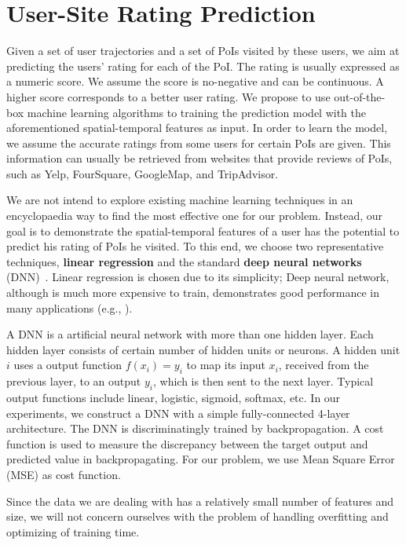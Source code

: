 \section{User-Site Rating Prediction}
\label{sec:prediction}

Given a set of user trajectories and a set of PoIs visited by these users, we aim at predicting the users' rating for each of the PoI. The rating is usually expressed as a numeric score. We assume the score is no-negative and can be continuous. A higher score corresponds to a better user rating. We propose to use out-of-the-box machine learning algorithms to training the prediction model with the aforementioned spatial-temporal features as input. In order to learn the model, we assume the accurate ratings from some users for certain PoIs are given. This information can usually be retrieved from websites that provide reviews of PoIs, such as Yelp, FourSquare, GoogleMap, and TripAdvisor. 

We are not intend to explore existing machine learning techniques in an encyclopaedia way to find the most effective one for our problem. Instead, our goal is to demonstrate the spatial-temporal features of a user has the potential to predict his rating of PoIs he visited. To this end, we choose two representative techniques, \textbf{linear regression} and the standard \textbf{deep neural networks} (DNN)~\cite{schmidhuber2015deep}. Linear regression is chosen due to its simplicity; Deep neural network, although is much more expensive to train, demonstrates good performance in many applications (e.g., \cite{ruiz2013innovative, hinton2012deep, krizhevsky2012imagenet}).

A DNN is a artificial neural network with more than one hidden layer. Each hidden layer consists of certain number of hidden units or neurons. A hidden unit $i$ uses a output function $f(x_i) = y_i$ to map its input $x_i$, received from the previous layer, to an output $y_i$, which is then sent to the next layer. Typical output functions include linear, logistic, sigmoid, softmax, etc. In our experiments, we construct a DNN with a simple fully-connected 4-layer architecture. The DNN is discriminatingly trained by backpropagation. A cost function is used to measure the discrepancy between the target output and predicted value in backpropagating. For our problem, we use Mean Square Error (MSE) as cost function. 

Since the data we are dealing with has a relatively small number of features and size, we will not concern ourselves with the problem of handling overfitting and optimizing of training time.